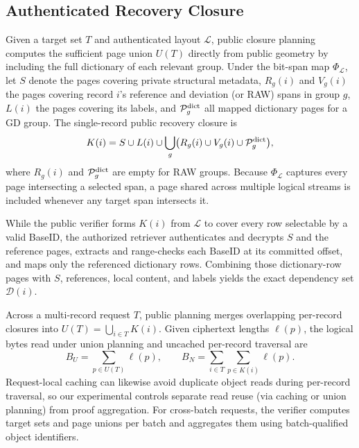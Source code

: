 \documentclass[10pt,journal]{IEEEtran}
\begin{document}
\subsection{Authenticated Recovery Closure}\label{sec:c2}
Given a target set $T$ and authenticated layout $\mathcal L$, public closure planning computes the sufficient page union $U(T)$ directly from public geometry by including the full dictionary of each relevant group. Under the bit-span map $\Phi_{\mathcal L}$, let $S$ denote the pages covering private structural metadata, $R_g(i)$ and $V_g(i)$ the pages covering record $i$'s reference and deviation (or RAW) spans in group $g$, $L(i)$ the pages covering its labels, and $\mathcal P_g^{\rm dict}$ all mapped dictionary pages for a GD group. The single-record public recovery closure is
\begin{equation}\label{eq:closure}
K(i)=S\cup L(i)\cup\bigcup_g
\bigl(R_g(i)\cup V_g(i)\cup\mathcal P_g^{\rm dict}\bigr),
\end{equation}
where $R_g(i)$ and $\mathcal P_g^{\rm dict}$ are empty for RAW groups. Because $\Phi_{\mathcal L}$ captures every page intersecting a selected span, a page shared across multiple logical streams is included whenever any target span intersects it.

While the public verifier forms $K(i)$ from $\mathcal L$ to cover every row selectable by a valid BaseID, the authorized retriever authenticates and decrypts $S$ and the reference pages, extracts and range-checks each BaseID at its committed offset, and maps only the referenced dictionary rows. Combining those dictionary-row pages with $S$, references, local content, and labels yields the exact dependency set $\mathcal D(i)$.

Across a multi-record request $T$, public planning merges overlapping per-record closures into $U(T)=\bigcup_{i\in T}K(i)$. Given ciphertext lengths $\ell(p)$, the logical bytes read under union planning and uncached per-record traversal are
\begin{equation}\label{eq:reads}
B_U=\sum_{p\in U(T)}\ell(p),\qquad
B_N=\sum_{i\in T}\sum_{p\in K(i)}\ell(p).
\end{equation}
Request-local caching can likewise avoid duplicate object reads during per-record traversal, so our experimental controls separate read reuse (via caching or union planning) from proof aggregation. For cross-batch requests, the verifier computes target sets and page unions per batch and aggregates them using batch-qualified object identifiers.
\end{document}
